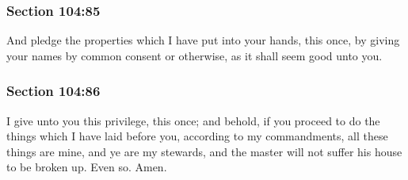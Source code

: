 	\subsubsection{Section 104:85} %
		\label{DC104-85}

		And pledge the properties which I have put into your hands, this once, by giving your names by common consent or otherwise, as it shall seem good unto you.


	\subsubsection{Section 104:86} %
		\label{DC104-86}

		I give unto you this privilege, this once; and behold, if you proceed to do the things which I have laid before you, according to my commandments, all these things are mine, and ye are my stewards, and the master will not suffer his house to be broken up.  Even so.  Amen.


